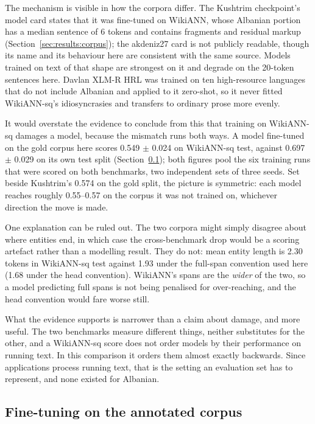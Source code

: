 The mechanism is visible in how the corpora differ. The Kushtrim checkpoint's model card states that it was fine-tuned on WikiANN, whose Albanian portion has a median sentence of 6 tokens and contains fragments and residual markup (Section~\ref{sec:results:corpus}); the akdeniz27 card is not publicly readable, though its name and its behaviour here are consistent with the same source. Models trained on text of that shape are strongest on it and degrade on the 20-token sentences here. Davlan XLM-R HRL was trained on ten high-resource languages that do not include Albanian and applied to it zero-shot, so it never fitted WikiANN-sq's idiosyncrasies and transfers to ordinary prose more evenly.

It would overstate the evidence to conclude from this that training on WikiANN-sq damages a model, because the mismatch runs both ways. A model fine-tuned on the gold corpus here scores 0.549 $\pm$ 0.024 on WikiANN-sq test, against 0.697 $\pm$ 0.029 on its own test split (Section~\ref{sec:results:gold-finetune}); both figures pool the six training runs that were scored on both benchmarks, two independent sets of three seeds. Set beside Kushtrim's 0.574 on the gold split, the picture is symmetric: each model reaches roughly 0.55--0.57 on the corpus it was not trained on, whichever direction the move is made.

One explanation can be ruled out. The two corpora might simply disagree about where entities end, in which case the cross-benchmark drop would be a scoring artefact rather than a modelling result. They do not: mean entity length is 2.30 tokens in WikiANN-sq test against 1.93 under the full-span convention used here (1.68 under the head convention). WikiANN's spans are the \emph{wider} of the two, so a model predicting full spans is not being penalised for over-reaching, and the head convention would fare worse still.

What the evidence supports is narrower than a claim about damage, and more useful. The two benchmarks measure different things, neither substitutes for the other, and a WikiANN-sq score does not order models by their performance on running text. In this comparison it orders them almost exactly backwards. Since applications process running text, that is the setting an evaluation set has to represent, and none existed for Albanian.

\subsection{Fine-tuning on the annotated corpus}
\label{sec:results:gold-finetune}

